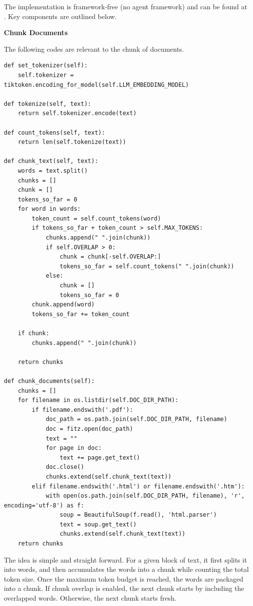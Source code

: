 The implementation is framework‑free (no agent framework) and can be found at \cite{sun2025document}. Key components are outlined below.

\vspace{0.1in}
\noindent \textbf{Chunk Documents}
\vspace{0.1in}

The following codes are relevant to the chunk of documents.

\begin{lstlisting}
def set_tokenizer(self):
    self.tokenizer = tiktoken.encoding_for_model(self.LLM_EMBEDDING_MODEL)

def tokenize(self, text):
    return self.tokenizer.encode(text)

def count_tokens(self, text):
    return len(self.tokenize(text))

def chunk_text(self, text):
    words = text.split()
    chunks = []
    chunk = []
    tokens_so_far = 0
    for word in words:
        token_count = self.count_tokens(word)
        if tokens_so_far + token_count > self.MAX_TOKENS:
            chunks.append(" ".join(chunk))
            if self.OVERLAP > 0:
                chunk = chunk[-self.OVERLAP:]
                tokens_so_far = self.count_tokens(" ".join(chunk))
            else:
                chunk = []
                tokens_so_far = 0
        chunk.append(word)
        tokens_so_far += token_count

    if chunk:
        chunks.append(" ".join(chunk))

    return chunks

def chunk_documents(self):
    chunks = []
    for filename in os.listdir(self.DOC_DIR_PATH):
        if filename.endswith('.pdf'):
            doc_path = os.path.join(self.DOC_DIR_PATH, filename)
            doc = fitz.open(doc_path)
            text = ""
            for page in doc:
                text += page.get_text()
            doc.close()
            chunks.extend(self.chunk_text(text))
        elif filename.endswith('.html') or filename.endswith('.htm'):
            with open(os.path.join(self.DOC_DIR_PATH, filename), 'r', encoding='utf-8') as f:
                soup = BeautifulSoup(f.read(), 'html.parser')
                text = soup.get_text()
                chunks.extend(self.chunk_text(text))
    return chunks
\end{lstlisting}

The idea is simple and straight forward. For a given block of text, it first splits it into words, and then accumulates the words into a chunk while counting the total token size. Once the maximum token budget is reached, the words are packaged into a chunk. If chunk overlap is enabled, the next chunk starts by including the overlapped words. Otherwise, the next chunk starts fresh.

